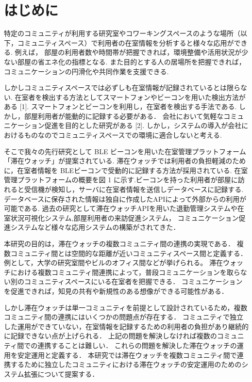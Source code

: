 \thispagestyle{myheadings}

\section{はじめに}
\label{sec:intro}
特定のコミュニティが利用する研究室やコワーキングスペースのような場所（以下，コミュニティスペース）で利用者の在室情報を分析すると様々な応用ができる.
例えば， 部屋の利用者数や時間帯が把握できれば，環境整備や活用状況が少ない部屋の省エネ化の指標となる.
また目的とする人の居場所を把握できれば，コミュニケーションの円滑化や共同作業を支援できる.

しかしコミュニティスペースでは必ずしも在室情報が記録されているとは限らない.
在室者を検出する方法としてスマートフォンやビーコンを用いた検出方法がある [1].
スマートフォンとビーコンを利用し，在室者を検出する手法である.
しかし，部屋利用者が能動的に記録する必要がある．
会社において気軽なコミュニケーション促進を目的とした研究がある [2].
しかし，システムの導入が会社におけるものなのでコミュニティスペースでの環境に適合しないと考える.

そこで我々の先行研究として BLE ビーコンを用いた在室管理プラットフォーム「滞在ウォッチ」が提案されている.
滞在ウォッチでは利用者の負担軽減のために，在室者情報を BLEビーコンで受動的に記録する方法が採用されている.
在室管理プラットフォームの概要を図 1 に示す.ビーコンを持った利用者が部屋に訪れると受信機が検知し，サーバに在室者情報を送信しデータベースに記録する.
データベースに保存された情報は独自に作成したAPIによって外部からの利用が可能である.
過去の研究として滞在ウォッチAPIを用いた退勤管理システムや在室状況可視化システム,部屋利用者の来訪促進システム，
コミュニケーション促進システムなど様々な応用システムの構築がされてきた．

本研究の目的は，滞在ウォッチの複数コミュニティ間の連携の実現である．
複数コミュニティ間とは空間的な距離が近いコミュニティスペース間と定義する．
例として，大学の研究室間やビルのオフィス間などが挙げられる。
滞在ウォッチにおける複数コミュニティ間連携によって，普段コミュニケーションを取らない別のコミュニティスペースにいる在室者を把握できる．
コミュニケーションを促進できれば，知見の共有や新規性のある想像ができる可能性がある．

しかし滞在ウォッチは単一コミュニティを前提として設計されているため，複数コミュニティ間の連携にはいくつかの問題点が存在する．
コミュニティで独立した運用ができていない，在室情報を記録するための利用者の負担があり継続的に記録できない点が上げられる．
上記の問題を解決しなければ複数のコミュニティ間での連携することは難しい．
これらの問題を解決した滞在ウォッチの運用を安定運用と定義する．
本研究では滞在ウォッチを複数コミュニティ間で連携するために独立したコミュニティにおける滞在ウォッチの安定運用のためのシステム拡張について提案する．